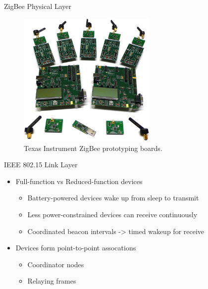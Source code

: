 \documentclass{beamer}
\begin{document}
\begin{frame}{ZigBee Physical Layer}
  \begin{figure}
  \includegraphics[width=0.6\textwidth]{ti_zigbee_devkit}
  \caption{Texas Instrument ZigBee prototyping boards.}
  \end{figure}
\end{frame}
    
\begin{frame}{IEEE 802.15 Link Layer}
  \begin{itemize}
    \item Full-function vs Reduced-function devices
	\begin{itemize}
  		\item Battery-powered devices wake up from sleep to transmit
  		\item Less power-constrained devices can receive continuously
  		\item Coordinated beacon intervals -> timed wakeup for receive
	\end{itemize}
	
  	\item Devices form point-to-point assocations
  	\begin{itemize}
  		\item Coordinator nodes
  		\item Relaying frames
  	\end{itemize}
  \end{itemize}
\end{frame}
\end{document}
